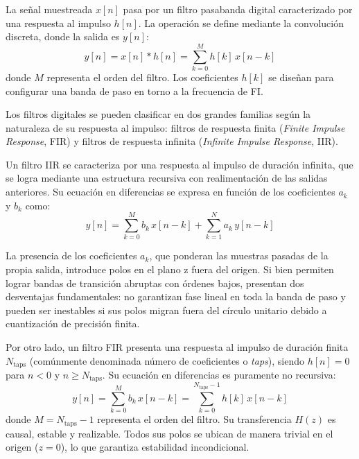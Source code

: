 La señal muestreada $x[n]$ pasa por un filtro pasabanda digital caracterizado por una respuesta al impulso $h[n]$. La operación se define mediante la convolución discreta, donde la salida es $y[n]$:
\begin{equation}
    y[n] = x[n] * h[n] = \sum_{k=0}^{M} h[k] \, x[n-k]
\end{equation}
donde $M$ representa el orden del filtro. Los coeficientes $h[k]$ se diseñan para configurar una banda de paso en torno a la frecuencia de FI.

Los filtros digitales se pueden clasificar en dos grandes familias según la naturaleza de su respuesta al impulso: filtros de respuesta finita (\textit{Finite Impulse Response}, FIR) y filtros de respuesta infinita (\textit{Infinite Impulse Response}, IIR).

Un filtro IIR se caracteriza por una respuesta al impulso de duración infinita, que se logra mediante una estructura recursiva con realimentación de las salidas anteriores. Su ecuación en diferencias se expresa en función de los coeficientes $a_k$ y $b_k$ como:
\begin{equation}
    y[n] = \sum_{k=0}^{M} b_k \, x[n-k] + \sum_{k=1}^{N} a_k \, y[n-k]
\end{equation}

La presencia de los coeficientes $a_k$, que ponderan las muestras pasadas de la propia salida, introduce polos en el plano z fuera del origen. Si bien permiten lograr bandas de transición abruptas con órdenes bajos, presentan dos desventajas fundamentales: no garantizan fase lineal en toda la banda de paso y pueden ser inestables si sus polos migran fuera del círculo unitario debido a cuantización de precisión finita.

Por otro lado, un filtro FIR presenta una respuesta al impulso de duración finita $N_{\text{taps}}$ (comúnmente denominada número de coeficientes o \textit{taps}), siendo $h[n] = 0$ para $n < 0$ y $n \ge N_{\text{taps}}$. Su ecuación en diferencias es puramente no recursiva:
\begin{equation}
    y[n] = \sum_{k=0}^{M} b_k \, x[n-k] = \sum_{k=0}^{N_{\text{taps}}-1} h[k] \, x[n-k]
\end{equation}
donde $M = N_{\text{taps}} - 1$ representa el orden del filtro. Su transferencia $H(z)$ es causal, estable y realizable. Todos sus polos se ubican de manera trivial en el origen ($z = 0$), lo que garantiza estabilidad incondicional.

